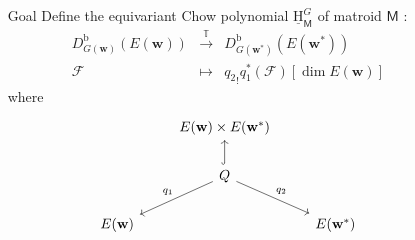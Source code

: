 \documentclass[final]{beamer}
\newlength{\sepwid}
\newlength{\onecolwid}
\newcommand{\M}{\mathsf{M}}
\newcommand{\uH}{\underline{\mathrm{H}}}
\newcommand{\TT}{\mathbb{T}}
\newcommand{\cF}{\mathcal{F}}
\newcommand{\bw}{\mathbf{w}}
\newcommand{\Db}{D^{\mathrm{b}}}
\begin{document}
\begin{frame}[t] %

\begin{columns}[t] %

\begin{column}{\sepwid}\end{column} %

\begin{column}{\onecolwid} %

\begin{block}{Goal}
Define the equivariant Chow polynomial $\uH_{\M}^G$ of matroid $\M$ :
\[
\begin{array}{rcl}
\Db_{G(\bw)}(E(\bw)) & \stackrel{\TT}{\longrightarrow} & \Db_{G(\bw^*)}(E(\bw^*))\\
\cF & \longmapsto & {q_2}_! q_1^*(\cF)[\dim E(\bw)]
\end{array}
\]
where
\[
\begin{tikzcd}[ampersand replacement=\&]
\ \& E(\bw) \times E(\bw^*) \& \\
\ \& Q \ar[hook]{u} \ar{dl}[swap]{q_1} \ar{dr}{q_2} \& \\
E(\bw) \& \& E(\bw^*)
\end{tikzcd}
\]

%


\end{block}
\end{column}
\end{columns}
\end{frame}
\end{document}

